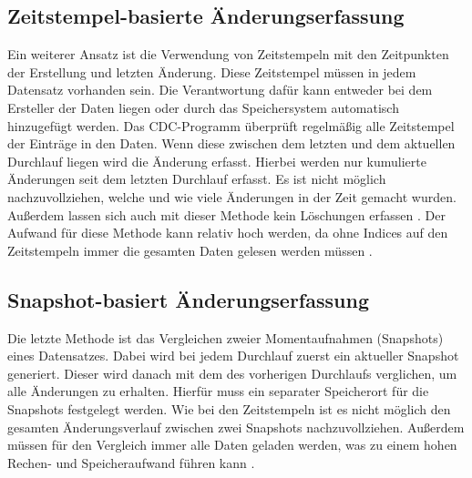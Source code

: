 \subsection{Zeitstempel-basierte Änderungserfassung}
Ein weiterer Ansatz ist die Verwendung von Zeitstempeln mit den Zeitpunkten der Erstellung und letzten Änderung.
Diese Zeitstempel müssen in jedem Datensatz vorhanden sein.
Die Verantwortung dafür kann entweder bei dem Ersteller der Daten liegen oder durch das Speichersystem automatisch hinzugefügt werden.
Das CDC-Programm überprüft regelmäßig alle Zeitstempel der Einträge in den Daten.
Wenn diese zwischen dem letzten und dem aktuellen Durchlauf liegen wird die Änderung erfasst.
Hierbei werden nur kumulierte Änderungen seit dem letzten Durchlauf erfasst.
Es ist nicht möglich nachzuvollziehen, welche und wie viele Änderungen in der Zeit gemacht wurden.
Außerdem lassen sich auch mit dieser Methode kein Löschungen erfassen \parencite{delta-view_gen}.
Der Aufwand für diese Methode kann relativ hoch werden, da ohne Indices auf den Zeitstempeln immer die gesamten Daten gelesen werden müssen \parencite{boeing}.

\subsection{Snapshot-basiert Änderungserfassung}
\label{sec:snaps}
Die letzte Methode ist das Vergleichen zweier Momentaufnahmen (Snapshots) eines Datensatzes.
Dabei wird bei jedem Durchlauf zuerst ein aktueller Snapshot generiert.
Dieser wird danach mit dem des vorherigen Durchlaufs verglichen, um alle Änderungen zu erhalten.
Hierfür muss ein separater Speicherort für die Snapshots festgelegt werden.
Wie bei den Zeitstempeln ist es nicht möglich den gesamten Änderungsverlauf zwischen zwei Snapshots nachzuvollziehen.
Außerdem müssen für den Vergleich immer alle Daten geladen werden, was zu einem hohen Rechen- und Speicheraufwand führen kann \parencite{cdc_in_nosql}.
